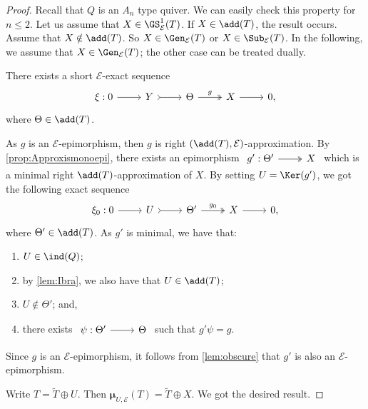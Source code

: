 \begin{proof}
    Recall that $Q$ is an $A_n$ type quiver. We can easily check this property for $n \leqslant 2$. Let us assume that $X \in \GS_\mathcal{E}^1(T)$. If $X \in \add(T)$, the result occurs. Assume that $X \notin \add(T)$. So $X \in \Gen_\mathcal{E}(T)$ or $X \in \Sub_\mathcal{E}(T)$. In the following, we assume that $X \in \Gen_\mathcal{E}(T)$; the other case can be treated dually.

    There exists a short $\mathcal{E}$-exact sequence
    \[\begin{tikzcd}
	\xi : 0 & Y & \Theta  & X &  0,
	\arrow[from=1-1, to=1-2]
	\arrow[tail, from=1-2, to=1-3]
	\arrow["g",two heads,from=1-3, to=1-4]
	\arrow[from=1-4, to=1-5]
    \end{tikzcd} \] where $\Theta \in \add(T)$. 

As $g$ is an $\mathcal{E}$-epimorphism,  then $g$ is right $(\add(T),\mathcal{E})$-approximation.  
    By \cref{prop:Approxismonoepi}, there exists an epimorphism $\begin{tikzcd}
	g': \Theta' & X 
        \arrow[two heads,from=1-1, to=1-2]
    \end{tikzcd}$ which is a minimal right $\add(T)$-approximation of $X$. By setting $U = \Ker(g')$, we got the following exact sequence
    \[\begin{tikzcd}
	\xi_0 : 0 & U & \Theta' & X &  0,
	\arrow[from=1-1, to=1-2]
	\arrow[tail, from=1-2, to=1-3]
	\arrow["g_0",two heads,from=1-3, to=1-4]
	\arrow[from=1-4, to=1-5]
    \end{tikzcd} \] 
    where $\Theta' \in \add(T)$. As $g'$ is minimal, we have that:
    \begin{enumerate}[label=$\bullet$, itemsep=1mm]
        \item $U \in \ind(Q)$; 
        \item by \cref{lem:Ibra}, we also have that $U \in \add(T)$;
        \item $U \notin \Theta'$; and,
        \item there exists $\begin{tikzcd}
	\psi: \Theta' & \Theta
        \arrow[from=1-1, to=1-2]
    \end{tikzcd}$ such that $g' \psi = g$.
    \end{enumerate}
    Since $g$ is an $\mathcal{E}$-epimorphism, it follows from \cref{lem:obscure} that $g'$ is also an $\mathcal{E}$-epimorphism.  
    
     Write $T = \widetilde{T} \oplus U$. Then $\pmb{\mu}_{U,\mathcal{E}}(T) = \widetilde{T} \oplus X$. We got the desired result.
    

\end{proof}
